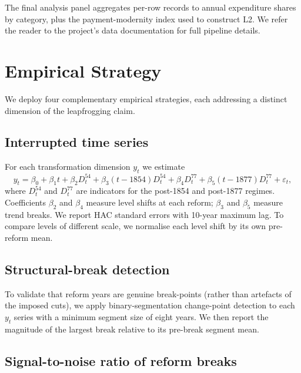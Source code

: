 \documentclass[11pt]{article}
\begin{document}
The final analysis panel aggregates per-row records to annual expenditure shares by category, plus the payment-modernity index used to construct L2. We refer the reader to the project's data documentation for full pipeline details.

\section{Empirical Strategy}
\label{sec:methods}

We deploy four complementary empirical strategies, each addressing a distinct dimension of the leapfrogging claim.

\subsection{Interrupted time series}

For each transformation dimension $y_{t}$ we estimate
\begin{equation}
\label{eq:its}
y_{t} = \beta_{0} + \beta_{1} t + \beta_{2} D^{54}_{t} + \beta_{3} (t - 1854) D^{54}_{t} + \beta_{4} D^{77}_{t} + \beta_{5} (t - 1877) D^{77}_{t} + \varepsilon_{t},
\end{equation}
where $D^{54}_{t}$ and $D^{77}_{t}$ are indicators for the post-1854 and post-1877 regimes. Coefficients $\beta_{2}$ and $\beta_{4}$ measure level shifts at each reform; $\beta_{3}$ and $\beta_{5}$ measure trend breaks. We report HAC standard errors with 10-year maximum lag. To compare levels of different scale, we normalise each level shift by its own pre-reform mean.

\subsection{Structural-break detection}

To validate that reform years are genuine break-points (rather than artefacts of the imposed cuts), we apply binary-segmentation change-point detection to each $y_{t}$ series with a minimum segment size of eight years. We then report the magnitude of the largest break relative to its pre-break segment mean.

\subsection{Signal-to-noise ratio of reform breaks}
\end{document}
